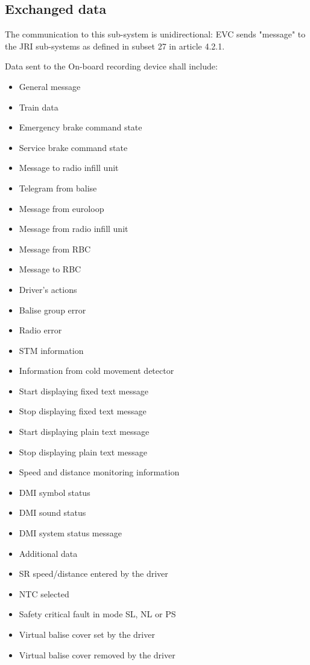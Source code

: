 \documentclass{template/openetcs_article}
\begin{document}
	\subsection{Exchanged data}
		The communication to this sub-system is unidirectional: EVC sends "message" to the JRI sub-systems as defined in subset 27 in article 4.2.1.
		
		Data sent to the On-board recording device shall include:
		\begin{itemize}
			\item General message
			\item Train data 
			\item Emergency brake command state
			\item Service brake command state
			\item Message to radio infill unit
			\item Telegram from balise
			\item Message from euroloop 
			\item Message from radio infill unit
			\item Message from RBC
			\item Message to RBC
			\item Driver’s actions
			\item Balise group error
			\item Radio error
			\item STM information
			\item Information from cold movement detector
			\item Start displaying fixed text message 
			\item Stop displaying fixed text message 
			\item Start displaying plain text message 
			\item Stop displaying plain text message 
			\item Speed and distance monitoring information 
			\item DMI symbol status
			\item DMI sound status
			\item DMI system status message
			\item Additional data
			\item SR speed/distance entered by the driver
			\item NTC selected
			\item Safety critical fault in mode SL, NL or PS
			\item Virtual balise cover set by the driver
			\item Virtual balise cover removed by the driver

\end{itemize}
\end{document}
